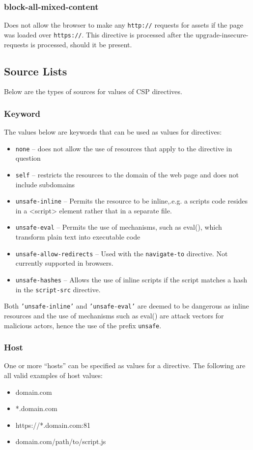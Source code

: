 \documentclass{mscreport}
\begin{document}
\subsubsection{block-all-mixed-content}

Does not allow the browser to make any \texttt{http://} requests for assets if the page was loaded over \texttt{https://}. This directive is processed after the upgrade-insecure-requests is processed, should it be present.

\subsection{Source Lists}

Below are the types of sources for values of CSP directives.

\subsubsection{Keyword}
The values below are keywords that can be used as values for directives:
\begin{itemize}
	\setlength\itemsep{0.1em}
	\item \texttt{none} – does not allow the use of resources that apply to the directive in question
	\item \texttt{self} – restricts the resources to the domain of the web page and does not include subdomains
	\item \texttt{unsafe-inline} – Permits the resource to be inline,.e.g. a scripts code resides in a <script> element rather that in a separate file.
	\item \texttt{unsafe-eval} – Permits the use of mechanisms, such as eval(), which transform plain text into executable code
	\item \texttt{unsafe-allow-redirects} – Used with the \texttt{navigate-to} directive. Not currently supported in browsers.
	\item \texttt{unsafe-hashes} – Allows the use of inline scripts if the script matches a hash in the \texttt{script-src} directive.
	
\end{itemize}

Both \texttt{'unsafe-inline'} and \texttt{'unsafe-eval'} are deemed to be dangerous as inline resources and the use of mechanisms such as eval() are attack vectors for malicious actors, hence the use of the prefix \texttt{unsafe}.

\subsubsection{Host}
One or more ``hosts'' can be specified as values for a directive. The following are all valid examples of host values:
\begin{itemize}
	\setlength\itemsep{0.1em}
	\item domain.com
	\item *.domain.com
	\item https://*.domain.com:81
	\item domain.com/path/to/script.js
\end{itemize}
\end{document}

